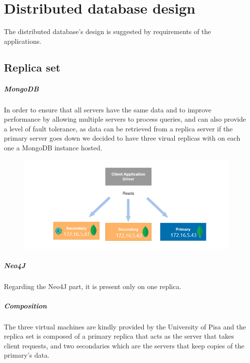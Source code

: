 \chapter{Distributed database design}

The distributed database's design is suggested by requirements of the applications.

\section{Replica set}

\paragraph{MongoDB}In order to ensure that all servers have the same data and 
to improve performance by allowing multiple servers to process queries, and can 
also provide a level of fault tolerance, as data can be retrieved from a 
replica server if the primary server goes down we decided to have three virual 
replicas with on each one a MongoDB instance hosted.

\begin{figure}[H]
	\centering
	\includegraphics[width=0.8\linewidth]{assets/replicaServerReades}
	\caption{}
	\label{fig:replicaserverreades}
\end{figure}


\paragraph{Neo4J}Regarding the Neo4J part, it is present only on one replica.

\paragraph{Composition} The three virtual machines are kindly provided by the University of Pisa and the replica set is composed of a primary replica that acts as the server that takes client requests, and two secondaries which are the servers that keep copies of the primary's data.

